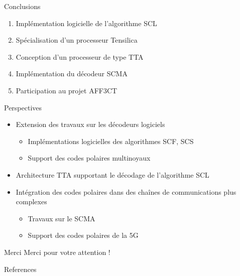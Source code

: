 \begin{frame}[c]{Conclusions}

  \begin{enumerate}
\renewcommand{\section}[2]{} %

    \renewcommand*{\bibfont}{\scriptsize}
    \nocite{leonardon_fast_2017,ghaffari_improving_2017,leonardon_tta_2018,Ghaffari2018,cassagne_fast_2017,cassagne_gdr_2017}
    \vfill
    \item<+-> Implémentation logicielle de l'algorithme  SCL
    \scriptsize{\printbibliography[keyword={fast-scl}]}
    \vfill
    \item<+-> Spécialisation d'un processeur Tensilica
    \scriptsize{\printbibliography[keyword={leonardon}]}
    \vfill
    \item<+-> Conception d'un processeur de type TTA
    \scriptsize{\printbibliography[keyword={tta}]}
    \vfill
    \item<+-> Implémentation du décodeur SCMA
    \printbibliography[keyword={ghaffari}]
    \vfill
    \item<+-> Participation au projet AFF3CT
    \printbibliography[keyword={aff3ct}]
    \vfill
  \end{enumerate}

\end{frame}

\begin{frame}[c]{Perspectives}

  \begin{itemize}
    \renewcommand*{\bibfont}{\scriptsize}
    \vfill
    \item<+-> Extension des travaux sur les décodeurs logiciels
    \begin{itemize}
      \item Implémentations logicielles des algorithmes SCF, SCS
      \item Support des codes polaires multinoyaux
    \end{itemize}
    \vfill
    \item<+-> Architecture TTA supportant le décodage de l'algorithme SCL
    \vfill
    \item<+-> Intégration des codes polaires dans des chaînes de communications plus complexes
    \begin{itemize}
      \item Travaux sur le SCMA
      \item Support des codes polaires de la 5G
    \end{itemize}
    \vfill
  \end{itemize}

\end{frame}

\begin{frame}[c]{Merci}
\vfill
Merci pour votre attention !
\vfill
\end{frame}

\begin{frame}[allowframebreaks]{References}
\renewcommand*{\bibfont}{\scriptsize}

\printbibliography
\end{frame}
